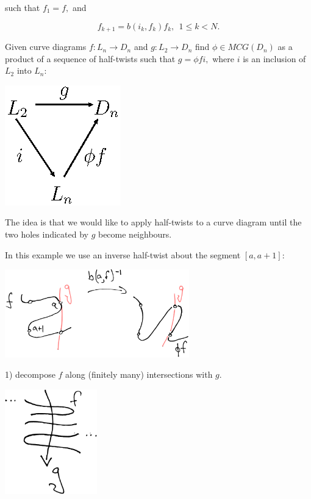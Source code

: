\documentclass[12pt,a4paper]{article}
\begin{document}
such that $f_1=f,$ and

        $$ f_{k+1} = b(i_k, f_k) f_k,\ \  \text{} 1\leq k<N.$$




Given curve diagrams $f:L_n\to D_n$ and $g:L_2\to D_n$
find $\phi\in MCG(D_n)$ as a product of
a sequence of half-twists such that
$g = \phi f i,$ where $i$ is an inclusion of $L_2$ into $L_n:$

\begin{center}
\includegraphics{halftwist-factor.eps}
\end{center}

The idea is that we would like to apply half-twists to a curve diagram
until the two holes indicated by $g$ become neighbours.


In this example we use an inverse half-twist about the segment $[a, a+1]:$

\begin{center}
\includegraphics[width=0.6\textwidth]{example-problem-1.eps}
\end{center}



1) decompose $f$ along (finitely many) intersections
with $g.$

\begin{center}
\includegraphics[width=0.3\textwidth]{snake-decompose.eps}
\end{center}
\end{document}
